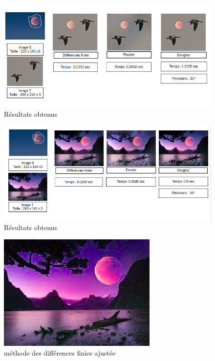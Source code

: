 \begin{figure}[H]
\centering
\includegraphics[scale=0.6]{Images/Resultats/1b.png}
\caption{Résultats obtenus}
\end{figure}

\begin{figure}[H]
\centering
\includegraphics[scale=0.6]{Images/Resultats/2b.png}
\caption{Résultats obtenus}
\end{figure}

\begin{figure}[H]
\centering
\includegraphics[scale=0.5]{Images/Resultats/LuneDFChangeSel.png}
\caption{méthode des différences finies ajustée}
\end{figure}


